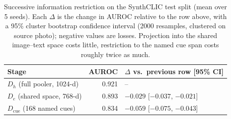 \begin{table}[!ht]
\centering
\scriptsize
\begin{tabular}{lrl}
\toprule
Stage & AUROC & $\Delta$ vs.\ previous row [95\% CI] \\
\midrule
$D_h$ (full pooler, 1024-d) & 0.921 & -- \\
$D_e$ (shared space, 768-d) & 0.893 & $-0.029$ [$-0.037$, $-0.021$] \\
$D_{\mathrm{cue}}$ (168 named cues) & 0.834 & $-0.059$ [$-0.075$, $-0.043$] \\
\bottomrule
\end{tabular}
\caption{Successive information restriction on the SynthCLIC test split (mean over 5 seeds). Each $\Delta$ is the change in AUROC relative to the row above, with a 95\% cluster bootstrap confidence interval (2000 resamples, clustered on source photo); negative values are losses. Projection into the shared image--text space costs little, restriction to the named cue span costs roughly twice as much.}
\label{tab:rev:cascade}
\end{table}
